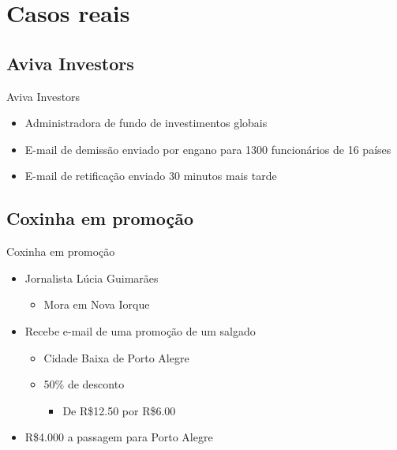\documentclass[dvipdfm]{beamer}
\begin{document}
\section{Casos reais}
\subsection{Aviva Investors}
\begin{frame}{Aviva Investors}
	\begin{itemize}
		\item Administradora de fundo de investimentos globais
		\item E-mail de demissão enviado por engano para 1300 funcionários de 16 países
		\linebreak
		\item E-mail de retificação enviado 30 minutos mais tarde
	\end{itemize}
\end{frame}

\subsection{Coxinha em promoção}
\begin{frame}{Coxinha em promoção}
	\begin{itemize}
		\item Jornalista Lúcia Guimarães
		\begin{itemize}
			\item Mora em Nova Iorque
		\end{itemize}
		\item Recebe e-mail de uma promoção de um salgado
		\begin{itemize}
			\item Cidade Baixa de Porto Alegre
			\item 50\% de desconto
			\begin{itemize}
				\item De R\$12.50 por R\$6.00
			\end{itemize}
		\end{itemize}
		\item R\$4.000 a passagem para Porto Alegre
	\end{itemize}
\end{frame}
\end{document}
